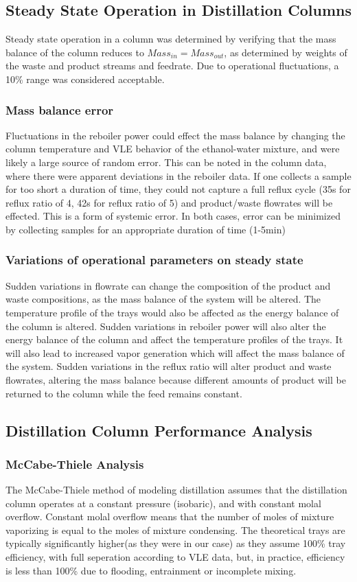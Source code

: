 \documentclass[lettersize,journal]{IEEEtran}
\begin{document}
\subsection{Steady State Operation in Distillation Columns}
Steady state operation in a column was determined by verifying that the mass balance of the column reduces to $Mass_{in} = Mass_{out}$, as determined by weights of the waste and product streams and feedrate. Due to operational fluctuations, a 10\% range was considered acceptable.
\subsubsection{Mass balance error}
Fluctuations in the reboiler power could effect the mass balance by changing the column temperature and VLE behavior of the ethanol-water mixture, and were likely a large source of random error. This can be noted in the column data, where there were apparent deviations in the reboiler data. If one collects a sample for too short a duration of time, they could not capture a full reflux cycle (35s for reflux ratio of 4, 42s for reflux ratio of 5) and product/waste flowrates will be effected. This is a form of systemic error. In both cases, error can be minimized by collecting samples for an appropriate duration of time (1-5min)
\subsubsection{Variations of operational parameters on steady state}
Sudden variations in flowrate can change the composition of the product and waste compositions, as the mass balance of the system will be altered. The temperature profile of the trays would also be affected as the energy balance of the column is altered. Sudden variations in reboiler power will also alter the energy balance of the column and affect the temperature profiles of the trays. It will also lead to increased vapor generation which will affect the mass balance of the system.
Sudden variations in the reflux ratio will alter product and waste flowrates, altering the mass balance because different amounts of product will be returned to the column while the feed remains constant.
\subsection{Distillation Column Performance Analysis}
\subsubsection{McCabe-Thiele Analysis}
The McCabe-Thiele method of modeling distillation assumes that the distillation column operates at a constant pressure (isobaric), and with constant molal overflow. Constant molal overflow means that the number of moles of mixture vaporizing is equal to the moles of mixture condensing. The theoretical trays are typically significantly higher(as they were in our case) as they assume 100\% tray efficiency, with full seperation according to VLE data, but, in practice, efficiency is less than 100\% due to flooding, entrainment or incomplete mixing.
\end{document}
